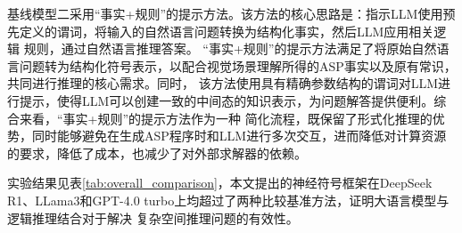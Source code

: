 基线模型二采用“事实+规则”的提示方法。该方法的核心思路是：指示LLM使用预先定义的谓词，将输入的自然语言问题转换为结构化事实，然后LLM应用相关逻辑
规则，通过自然语言推理答案。
“事实+规则”的提示方法满足了将原始自然语言问题转为结构化符号表示，以配合视觉场景理解所得的ASP事实以及原有常识，共同进行推理的核心需求。同时，
该方法使用具有精确参数结构的谓词对LLM进行提示，使得LLM可以创建一致的中间态的知识表示，为问题解答提供便利。综合来看，“事实+规则”的提示方法作为一种
简化流程，既保留了形式化推理的优势，同时能够避免在生成ASP程序时和LLM进行多次交互，进而降低对计算资源的要求，降低了成本，也减少了对外部求解器的依赖。

实验结果见表\ref{tab:overall_comparison}，本文提出的神经符号框架在DeepSeek R1、LLama3和GPT-4.0 turbo上均超过了两种比较基准方法，证明大语言模型与逻辑推理结合对于解决
复杂空间推理问题的有效性。

\begin{table}[h]
    \centering
    \small  %
    \renewcommand{\arraystretch}{1.2}  %
    \setlength{\tabcolsep}{5pt}  %
    \caption{不同模型及方法在各问题类型上的表现}
    \label{tab:overall_comparison}
\end{table}

